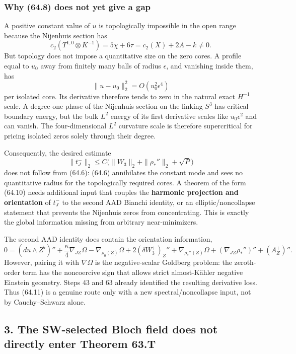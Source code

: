 \documentclass[
  10pt,
]{report}
\begin{document}
\hypertarget{why-64.8-does-not-yet-give-a-gap}{%
\subsubsection{Why (64.8) does not yet give a
gap}\label{why-64.8-does-not-yet-give-a-gap}}

A positive constant value of \(u\) is topologically impossible in the
open range because the Nijenhuis section has \[
 c_2(T^{1,0}\otimes K^{-1})=5\chi+6\tau=c_2(X)+2A-k\ne0.
\] But topology does not impose a quantitative size on the zero cores. A
profile equal to \(u_0\) away from finitely many balls of radius
\(\epsilon\), and vanishing inside them, has \[
 \|u-u_0\|_2^2=O(u_0^2\epsilon^4)
\] per isolated core. Its derivative therefore tends to zero in the
natural exact \(H^{-1}\) scale. A degree-one phase of the Nijenhuis
section on the linking \(S^3\) has critical boundary energy, but the
bulk \(L^2\) energy of its first derivative scales like
\(u_0\epsilon^2\) and can vanish. The four-dimensional \(L^2\) curvature
scale is therefore supercritical for pricing isolated zeros solely
through their degree.

Consequently, the desired estimate \[
 \|t_J^-\|_2\le C\bigl(\|W_3\|_2+\|\rho_*''\|_2+\sqrt P\bigr)
\tag{64.10}
\] does not follow from (64.6): (64.6) annihilates the constant mode and
sees no quantitative radius for the topologically required cores. A
theorem of the form (64.10) needs additional input that couples the
\textbf{harmonic projection and orientation} of \(t_J^-\) to the second
AAD Bianchi identity, or an elliptic/noncollapse statement that prevents
the Nijenhuis zeros from concentrating. This is exactly the global
information missing from arbitrary near-minimizers.

The second AAD identity does contain the orientation information, \[
0=(d u\wedge Z^\flat)''+\frac\kappa4\nabla_{JZ}\Omega-\nabla_{\rho_0(Z)}\Omega
+2(\delta W_3^+)_Z''+\nabla_{\rho_*''(Z)}\Omega
+(\nabla_{JZ}\rho_*'')''+(A_Z^+)''.
\tag{64.11}
\] However, pairing it with \(\nabla\Omega\) is the negative-scalar
Goldberg problem: the zeroth-order term has the noncoercive sign that
allows strict almost-Kähler negative Einstein geometry. Steps 43 and 63
already identified the resulting derivative loss. Thus (64.11) is a
genuine route only with a new spectral/noncollapse input, not by
Cauchy--Schwarz alone.

\hypertarget{the-sw-selected-bloch-field-does-not-directly-enter-theorem-63.t}{%
\subsection{3. The SW-selected Bloch field does not directly enter
Theorem
63.T}\label{the-sw-selected-bloch-field-does-not-directly-enter-theorem-63.t}}
\end{document}
